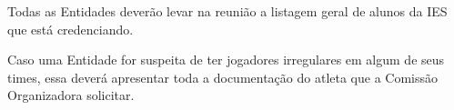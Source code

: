 \begin{article}
    Todas as Entidades deverão levar na reunião a listagem geral de alunos da IES que está credenciando.
\end{article}

\begin{article}
    Caso uma Entidade for suspeita de ter jogadores irregulares em algum de seus times, essa deverá apresentar toda a documentação do atleta que a Comissão Organizadora solicitar.
\end{article}

